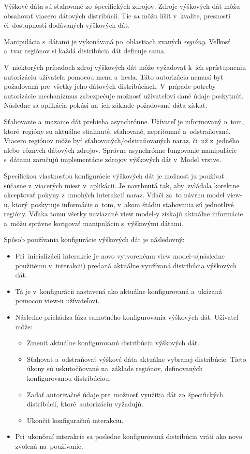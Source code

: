 Výškové dáta sú sťahované zo~špecifických zdrojov. Zdroje výškových dát môžu obsahovať viacero dátových distribúcií. Tie sa môžu líšiť v~kvalite, presnosti či~dostupnosti dodávaných výškových dát. 

Manipulácia s~dátami je vykonávaná po~oblastiach zvaných \textit{regióny}. Veľkosť a~tvar regiónov si každá distribúcia dát definuje sama. 

V~niektorých prípadoch zdroj výškových dát môže vyžadovať k~ich sprístupneniu autorizáciu užívateľa pomocou mena a~hesla. Táto autorizácia nemusí byť požadovaná pre~všetky jeho dátových distribúciach. V~prípade potreby autorizácie mechanizmus zabezpečuje možnosť užívateľovi dané údaje poskytnúť. Následne sa aplikácia pokúsi na~ich základe požadované dáta získať.   

Sťahovanie a~mazanie dát prebieha asynchrónne. Užívateľ je informovaný o~tom, ktoré~regióny su aktuálne stiahnuté, sťahované, neprítomné a~odstraňované. Viacero regiónov môže byť sťahovaných/odstraňovaných naraz, či~už z~jedného alebo~rôznych dátových zdrojov. Správne asynchrónne fungovanie manipulácie s~dátami zaručujú implementácie zdrojov výškových dát v~Model vrstve.

Špecifickou vlastnosťou konfigurácie výškových dát je možnosť ju používať súčasne z~viacerých miest v~aplikácii. Je navrhnutá tak, aby~zvládala korektne akceptovať pokyny z~mnohých interakcií naraz. Vďačí za~to návrhu model view-u, ktorý~poskytuje informácie o~tom, v~akom štádiu sťahovania sú jednotlivé regióny. Vďaka tomu všetky naviazané view model-y získajú aktuálne informácie a~môžu správne korigovať manipuláciu s~výškovými dátami.

Spôsob používania konfigurácie výškových dát je následovný:
\begin{itemize}
    \item Pri~inicializácii interakcie je novo vytvorenému view model-u(následne použitému v~interakcii) predaná aktuálne využívaná distribúcia výškových dát.
    \item Tá je v~konfigurácii nastavená ako aktuálne konfigurovaná a~ukázaná pomocou view-u užívateľovi.
    \item Následne prichádza fáza samotného konfigurovania výškových dát. Užívateľ môže:
    \begin{itemize}
        \item Zmeniť aktuálne konfigurovanú distribúciu výškových dát.
        \item Sťahovať a~odstraňovať výškové dáta aktuálne vybranej distribúcie. Tieto úkony sú uskutočňované na~základe regiónov, definovaných konfigurovanou distribúciou.
        \item Zadať autorizačné údaje pre~možnosť využitia dát zo~špecifických distribúcií, ktoré~autorizáciu vyžadujú. 
        \item Ukončiť konfiguračnú interakciu.
    \end{itemize} 
    \item Pri~ukončení interakcie sa posledne konfigurovaná distribúcia vráti ako novo zvolená na~používanie.
\end{itemize}


